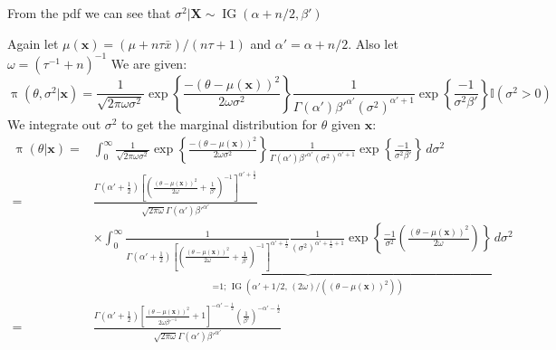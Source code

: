 \documentclass[11pt]{article}
\begin{document}
  From the pdf we can see that $\sigma^2 | \mathbf{X} \sim \operatorname{IG}(\alpha + n/2, \beta')$
\item %
Again let $\mu(\mathbf{x}) = (\mu + n\tau\bar x)/(n\tau+1)$ and $\alpha' = \alpha+n/2$.  Also let $\omega = (\tau^{-1} +n)^{-1}$
We are given:
\[
  \operatorname{\pi}(\theta, \sigma^2|\mathbf{x})
    = 
      \frac{1}{\sqrt{2\pi\omega\sigma^2}}
      \exp \left\{
        \frac{-(\theta-\mu(\mathbf{x}))^2}{2\omega\sigma^2}
      \right\}
      \frac{1}{\Gamma(\alpha') \beta'^{\alpha'} (\sigma^2)^{\alpha'+1}}
      \exp \left\{
        \frac{-1}{\sigma^2 \beta'}
      \right\}
      \mathbb{I}(\sigma^2>0)
\]
We integrate out $\sigma^2$ to get the marginal distribution for $\theta$ given $\mathbf{x}$:
\begin{align*}
  \operatorname{\pi}(\theta|\mathbf{x})
    = &
      \int_0^\infty
      \frac{1}{\sqrt{2\pi\omega\sigma^2}}
      \exp \left\{
        \frac{-(\theta-\mu(\mathbf{x}))^2}{2\omega\sigma^2}
      \right\}
      \frac{1}{\Gamma(\alpha') \beta'^{\alpha'} (\sigma^2)^{\alpha'+1}}
      \exp \left\{
        \frac{-1}{\sigma^2 \beta'}
      \right\}
      \, d\sigma^2 \\
    = &
      \frac{
        \Gamma(\alpha'+\frac{1}{2})
        \left[
          \left(
            \frac{(\theta-\mu(\mathbf{x}))^2}{2\omega} + \frac{1}{\beta'}
          \right)^{-1}
        \right]^{\alpha'+\frac{1}{2}}}
      {
        \sqrt{2\pi\omega} \Gamma(\alpha') \beta'^{\alpha'}
      } \\
    & \times
      \underbrace{
        \int_0^\infty
        \frac{1}{
          \Gamma(\alpha'+\frac{1}{2})
          \left[
            \left(
              \frac{(\theta-\mu(\mathbf{x}))^2}{2\omega} + \frac{1}{\beta'}
            \right)^{-1}
          \right]^{\alpha'+\frac{1}{2}}
        }
        \frac{1}{(\sigma^2)^{\alpha' + \frac{1}{2} + 1}}
        \exp \left\{
          \frac{-1}{\sigma^2}
          \left(
            \frac{\left( \theta-\mu(\mathbf{x}) \right)^2}{2\omega}
          \right)
        \right\} \, d\sigma^2
      }_{\text{=1; } \operatorname{IG}\left(\alpha' + 1/2, \, (2\omega)/((\theta-\mu(\mathbf{x}))^2)\right)} \\
    = &
      \frac{
        \Gamma(\alpha'+\frac{1}{2})
        \left[
          \frac{(\theta-\mu(\mathbf{x}))^2}{2\omega {\beta'}^{-1}} + 1
        \right]^{-\alpha'-\frac{1}{2}}
        \left(
          \frac{1}{\beta'}
        \right)^{-\alpha'-\frac{1}{2}}
      }
      {
        \sqrt{2\pi\omega} \Gamma(\alpha') {\beta'}^{\alpha'}
      } \\      

\end{align*}
\end{document}

